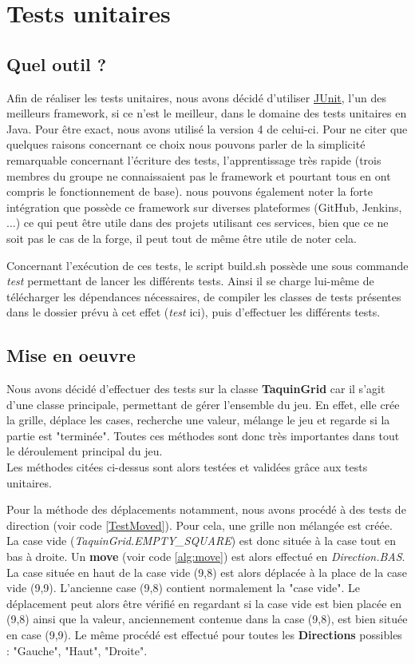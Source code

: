 	\section{Tests unitaires}
		\subsection{Quel outil ?}

			Afin de réaliser les tests unitaires, nous avons décidé d'utiliser \href{https://junit.org/junit4/}{JUnit}, l'un des meilleurs framework, si ce n'est le meilleur, dans le domaine des tests unitaires en Java. Pour être exact, nous avons utilisé la version 4 de celui-ci. Pour ne citer que quelques raisons concernant ce choix nous pouvons parler de la simplicité remarquable concernant l'écriture des tests, l'apprentissage très rapide (trois membres du groupe ne connaissaient pas le framework et pourtant tous en ont compris le fonctionnement de base). nous pouvons également noter la forte intégration que possède ce framework sur diverses plateformes (GitHub, Jenkins, ...) ce qui peut être utile dans des projets utilisant ces services, bien que ce ne soit pas le cas de la forge, il peut tout de même être utile de noter cela.

			Concernant l’exécution de ces tests, le script build.sh possède une sous commande \textit{test} permettant de lancer les différents tests. Ainsi il se charge lui-même de télécharger les dépendances nécessaires, de compiler les classes de tests présentes dans le dossier prévu à cet effet (\textit{test} ici), puis d'effectuer les différents tests.

		\subsection{Mise en oeuvre}
			Nous avons décidé d'effectuer des tests sur la classe \textbf{TaquinGrid} car il s'agit d'une classe principale, permettant de gérer l'ensemble du jeu. En effet, elle crée la grille, déplace les cases, recherche une valeur, mélange le jeu et regarde si la partie est "terminée". Toutes ces méthodes sont donc très importantes dans tout le déroulement principal du jeu.\\
			Les méthodes citées ci-dessus sont alors testées et validées grâce aux tests unitaires.

			Pour la méthode des déplacements notamment, nous avons procédé à des tests de direction (voir code \ref{TestMoved}). Pour cela, une grille non mélangée est créée. La case vide (\textit{TaquinGrid.EMPTY\_SQUARE}) est donc située à la case tout en bas à droite. Un \textbf{move} (voir code \ref{alg:move}) est alors effectué en \textit{Direction.BAS}. La case située en haut de la case vide (9,8) est alors déplacée à la place de la case vide (9,9). L'ancienne case (9,8) contient normalement la "case vide". Le déplacement peut alors être vérifié en regardant si la case vide est bien placée en (9,8) ainsi que la valeur, anciennement contenue dans la case (9,8), est bien située en case (9,9). Le même procédé est effectué pour toutes les \textbf{Directions} possibles : "Gauche", "Haut", "Droite".

